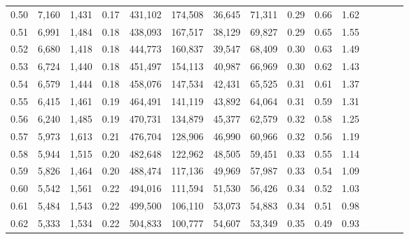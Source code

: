 \begin{tabular}{rrrcrrrrrrrrrrr}
0.50 &   7,160 &  1,431 &                                       0.17 &  431,102 &  174,508 &   36,645 &   71,311 &  0.29 &  0.66 &                         1.62 \\
0.51 &   6,991 &  1,484 &                                       0.18 &  438,093 &  167,517 &   38,129 &   69,827 &  0.29 &  0.65 &                         1.55 \\
0.52 &   6,680 &  1,418 &                                       0.18 &  444,773 &  160,837 &   39,547 &   68,409 &  0.30 &  0.63 &                         1.49 \\
0.53 &   6,724 &  1,440 &                                       0.18 &  451,497 &  154,113 &   40,987 &   66,969 &  0.30 &  0.62 &                         1.43 \\
0.54 &   6,579 &  1,444 &                                       0.18 &  458,076 &  147,534 &   42,431 &   65,525 &  0.31 &  0.61 &                         1.37 \\
0.55 &   6,415 &  1,461 &                                       0.19 &  464,491 &  141,119 &   43,892 &   64,064 &  0.31 &  0.59 &                         1.31 \\
0.56 &   6,240 &  1,485 &                                       0.19 &  470,731 &  134,879 &   45,377 &   62,579 &  0.32 &  0.58 &                         1.25 \\
0.57 &   5,973 &  1,613 &                                       0.21 &  476,704 &  128,906 &   46,990 &   60,966 &  0.32 &  0.56 &                         1.19 \\
0.58 &   5,944 &  1,515 &                                       0.20 &  482,648 &  122,962 &   48,505 &   59,451 &  0.33 &  0.55 &                         1.14 \\
0.59 &   5,826 &  1,464 &                                       0.20 &  488,474 &  117,136 &   49,969 &   57,987 &  0.33 &  0.54 &                         1.09 \\
0.60 &   5,542 &  1,561 &                                       0.22 &  494,016 &  111,594 &   51,530 &   56,426 &  0.34 &  0.52 &                         1.03 \\
0.61 &   5,484 &  1,543 &                                       0.22 &  499,500 &  106,110 &   53,073 &   54,883 &  0.34 &  0.51 &                         0.98 \\
0.62 &   5,333 &  1,534 &                                       0.22 &  504,833 &  100,777 &   54,607 &   53,349 &  0.35 &  0.49 &                         0.93 \\

\end{tabular}
